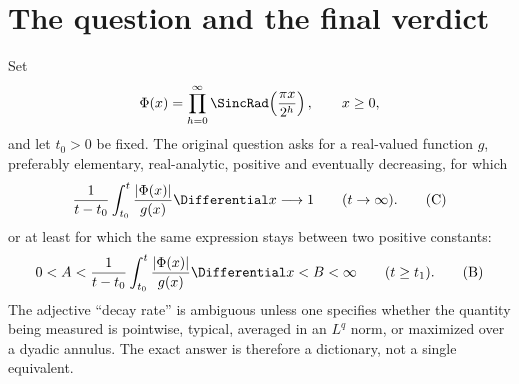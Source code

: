 \documentclass[11pt]{article}
\theoremstyle{definition}
\theoremstyle{remark}
\begin{document}
\begin{abstract}
Finally, for the actual largest value
\(M_k=\max_{2^k\le x\le2^{k+1}}|\Phi(x)|\), we verify the sharp boundary-layer
formula
\[
 \begin{aligned}
 \log M_k={}&-\frac{\log2}{2}k(k+1)-(k+1)\log\pi
 +(k+1)\log\frac{\sqrt3}{2}\\
 &-\frac{W(c(k+1))^2+2W(c(k+1))}{2\log2}
 +\BigO((\log\log k)^2),
 \end{aligned}
\]
where \(c=(\log2)\sqrt{3/2}/\pi\).  This includes a second log-normal
suppression in \(\log\log x\), and is distinct from every fixed-ray or mean
law.
\end{abstract}

\begingroup
\footnotesize
\tableofcontents
\endgroup
\newpage

\section{The question and the final verdict}

Set
\begin{equation}
 \Phi(x)=\prod_{h=0}^{\infty}
 \SincRad\!\left(\frac{\pi x}{2^h}\right),
 \qquad x\ge0,
 \label{eq:Phi-def}
\end{equation}
and let \(t_0>0\) be fixed.  The original question asks for a real-valued
function \(g\), preferably elementary, real-analytic, positive and eventually
decreasing, for which\cite{mse-question,question-source}
\begin{equation*}
 \frac1{t-t_0}\int_{t_0}^{t}\frac{|\Phi(x)|}{g(x)}\Differential x\longrightarrow1
 \qquad(t\to\infty).
 \tag{C}
\end{equation*}
or at least for which the same expression stays between two positive constants:
\begin{equation*}
 0<A<\frac1{t-t_0}\int_{t_0}^{t}\frac{|\Phi(x)|}{g(x)}\Differential x<B<\infty
 \qquad(t\ge t_1).
 \tag{B}
\end{equation*}
The adjective ``decay rate'' is ambiguous unless one specifies whether the
quantity being measured is pointwise, typical, averaged in an \(L^q\) norm, or
maximized over a dyadic annulus.  The exact answer is therefore a dictionary,
not a single equivalent.
\end{document}

